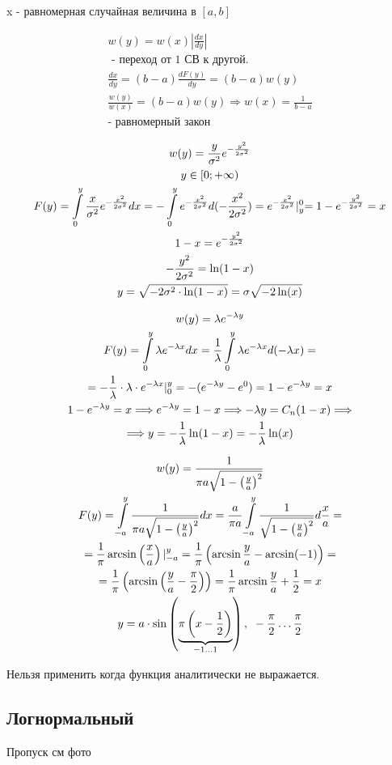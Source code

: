 \documentclass[14pt,a4paper,oneside]{extarticle}
\begin{document}
x - равномерная случайная величина в $[a,b]$

\begin{gather*}
    w(y)=w(x)\left\lvert\frac{dx}{dy} \right\rvert \\\text{ - переход от 1 СВ к другой.}\\
    \frac{dx}{dy}=(b-a)\frac{dF(y)}{dy}=(b-a)w(y)\\
    \frac{w(y)}{w(x)}=(b-a)w(y)\Longrightarrow w(x) = \frac{1}{b-a} \\\text{- равномерный закон}
\end{gather*}

\begin{gather*}
    w(y)=\frac{y}{\sigma^2}e^{-\frac{y^2}{2\sigma^2}}\\
    y\in[0;+\infty)\\
    F(y)=\int\displaylimits_{0}^{y}\frac{x}{\sigma^2}e^{-\frac{x^2}{2\sigma^2}}dx=-\int\displaylimits_{0}^{y}e^{-\frac{x^2}{2\sigma^2}}d(-\frac{x^2}{2\sigma^2})=e^{-\frac{x^2}{2\sigma^2}}\lvert_y^0=1-e^{-\frac{y^2}{2\sigma^2}}=x\\
    1-x=e^{-\frac{y^2}{2\sigma^2}}\\
    -\frac{y^2}{2\sigma^2}=\ln(1-x)\\
    y=\sqrt{-2\sigma^2\cdot\ln(1-x)}=\sigma\sqrt{-2\ln(x)}\\
\end{gather*}

\begin{gather*}
    w(y)=\lambda e^{-\lambda y}\\
    F(y)=\int\displaylimits_{0}^{y}\lambda e^{-\lambda x}dx=\frac{1}{\lambda}\int\displaylimits_{0}^{y}\lambda e^{-\lambda x}d(-\lambda x)=\\
    =-\frac{1}{\lambda}\cdot\lambda\cdot e^{-\lambda x}|_0^y=-(e^{-\lambda y}-e^0)=1-e^{-\lambda y}=x \\
    1-e^{-\lambda y}=x\Longrightarrow e^{-\lambda y}=1-x\Longrightarrow -\lambda y= C_n(1-x)\Longrightarrow\\
    \Longrightarrow y=-\frac{1}{\lambda}\ln(1-x)=-\frac{1}{\lambda}\ln(x)
\end{gather*}

\begin{gather*}
    w(y)=\frac{1}{\pi a\sqrt{1-\left(\frac{y}{a}\right)^2 }}\\
    F(y)=\int\displaylimits_{-a}^{y}\frac{1}{\pi a\sqrt{1-\left(\frac{y}{a}\right)^2 }}dx=\frac{a}{\pi a}\int\displaylimits_{-a}^{y}\frac{1}{\sqrt{1-\left(\frac{y}{a}\right)^2 }}d\frac{x}{a}=\\
    =\frac{1}{\pi}\arcsin\left(\frac{x}{a}\right)|_{-a}^{y}=\frac{1}{\pi}\left(\arcsin\frac{y}{a}-\arcsin(-1)\right)=\\
    =\frac{1}{\pi}\left(\arcsin\left(\frac{y}{a}-\frac{\pi}{2}\right)\right)=\frac{1}{\pi}\arcsin\frac{y}{a}+\frac{1}{2}=x\\
    y=a\cdot\sin\left(\underbrace{\pi\left(x-\frac{1}{2}\right) }_{-1\ldots1} \right),\text{ } -\frac{\pi}{2}\ldots\frac{\pi}{2}
\end{gather*}

Нельзя применить когда функция аналитически не выражается.

\subsection{Логнормальный}

Пропуск см фото
\end{document}
